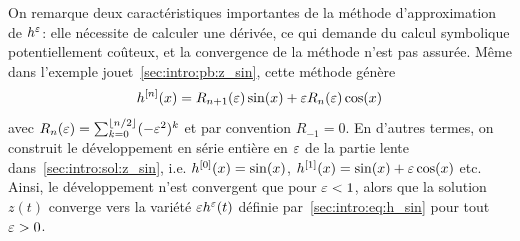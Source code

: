 On remarque deux caractéristiques importantes de la méthode d'approximation de $h^\varepsilon$: elle nécessite de calculer une dérivée, ce qui demande du calcul symbolique potentiellement coûteux, et la convergence de la méthode n'est pas assurée. Même dans l'exemple jouet~\eqref{sec:intro:pb:z_sin}, cette méthode génère
\begin{equation*}
    h^{[n]}(x) = R_{n+1}(\varepsilon) \sin(x) + \varepsilon R_{n}(\varepsilon) \cos(x) 
\end{equation*}
avec $R_n(\varepsilon) = \sum_{k = 0}^{\left\lfloor n/2 \right\rfloor} (-\varepsilon^2)^{k}$ et par convention $R_{-1} = 0$. En d'autres termes, on construit le développement en série entière en $\varepsilon$ de la partie lente dans~\eqref{sec:intro:sol:z_sin}, i.e. $h^{[0]}(x) = \sin(x)$, $h^{[1]} (x) = \sin(x) + \varepsilon \cos(x)$ etc. Ainsi, le développement n'est convergent que pour $\varepsilon < 1$, alors que la solution $z(t)$ converge vers la variété $\varepsilon h^\varepsilon(t)$ définie par~\eqref{sec:intro:eq:h_sin} pour tout $\varepsilon > 0$. 


